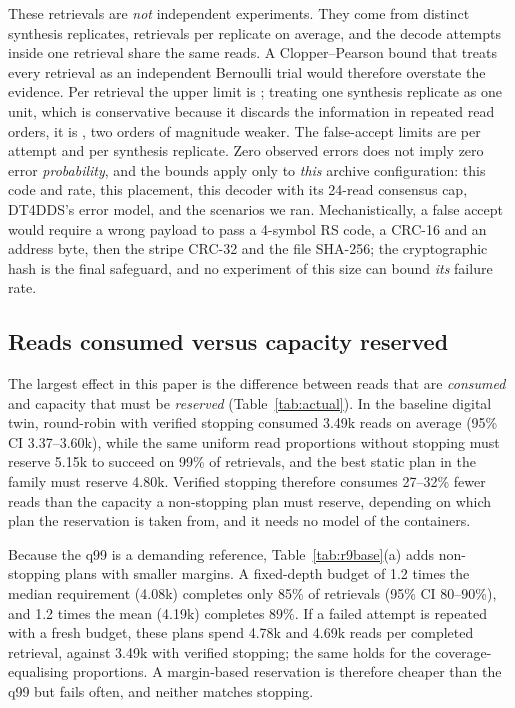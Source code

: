 \documentclass[conference,onecolumn,11pt]{IEEEtran}
\begin{document}
These retrievals are \emph{not} independent experiments.  They come from \SafeUnits{} distinct synthesis
replicates, \SafePerUnit{} retrievals per replicate on average, and the decode attempts inside one
retrieval share the same reads.  A Clopper--Pearson bound that treats every retrieval as an independent
Bernoulli trial would therefore overstate the evidence.  Per retrieval the upper limit is \SafeWUB{};
treating one synthesis replicate as one unit, which is conservative because it discards the information
in repeated read orders, it is \SafeWUBc{}, two orders of magnitude weaker.  The false-accept limits are
\SafeFUB{} per attempt and \SafeFUBc{} per synthesis replicate.  Zero observed errors does not imply zero
error \emph{probability}, and the bounds apply only to \emph{this} archive configuration: this code and
rate, this placement, this decoder with its 24-read consensus cap, DT4DDS's error model, and the
scenarios we ran.  Mechanistically, a false accept would require a wrong payload to pass a 4-symbol RS
code, a CRC-16 and an address byte, then the stripe CRC-32 and the file SHA-256; the cryptographic hash is
the final safeguard, and no experiment of this size can bound \emph{its} failure rate.

\subsection{Reads consumed versus capacity reserved}\label{sec:res-actual}

The largest effect in this paper is the difference between reads that are \emph{consumed} and capacity
that must be \emph{reserved} (Table~\ref{tab:actual}).  In the baseline digital twin, round-robin with
verified stopping consumed 3.49k reads on average (95\% CI 3.37--3.60k), while the same uniform read
proportions without stopping must reserve 5.15k to succeed on 99\% of retrievals, and the best static
plan in the family must reserve 4.80k.  Verified stopping therefore consumes 27--32\% fewer reads than
the capacity a non-stopping plan must reserve, depending on which plan the reservation is taken from, and
it needs no model of the containers.


Because the q99 is a demanding reference, Table~\ref{tab:r9base}(a) adds non-stopping plans with smaller
margins.  A fixed-depth budget of 1.2 times the median requirement (4.08k) completes only
85\% of retrievals (95\% CI 80--90\%), and 1.2 times the mean
(4.19k) completes 89\%.  If a failed attempt is repeated with a fresh budget,
these plans spend 4.78k and 4.69k reads per completed retrieval, against 3.49k with
verified stopping; the same holds for the coverage-equalising proportions.  A margin-based reservation is
therefore cheaper than the q99 but fails often, and neither matches stopping.
\end{document}

